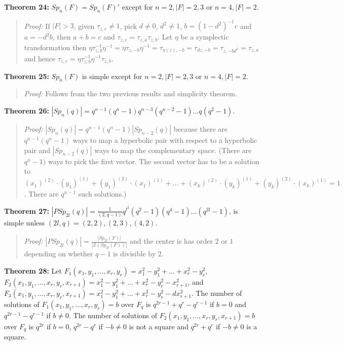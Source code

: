 {\bf Theorem 24:}
$Sp_n(F) = Sp_n(F)'$ except for $n=2, |F|= 2,3$ or $n=4, |F|=2$.
\begin{quote}
\emph{Proof:}  
If $|F|>3$, given $\tau_{z,c} \ne 1$, pick $d \ne 0$, $d^2 \ne 1$,
$b=(1-d^2)^{-1}c$ and $a= -d^2b$, then $a+b=c$ and 
$ \tau_{z,c} = \tau_{z,a} \tau_{z,b}$.  Let $\eta$ be a symplectic transformation then
$\eta \tau_{z,b}^{-1} \eta^{-1} =
\eta \tau_{z,-b} \eta^{-1}=
\tau_{\eta(z),-b}= \tau_{dz,-b}= \tau_{z,-bd^2}= \tau_{z,a}$ and hence
$\tau_{z,c}= \eta \tau_{z,b}^{-1} \eta^{-1} \tau_{z,b}$.
\end{quote}
{\bf Theorem 25:}
$Sp_n(F)$ is simple except for $n=2, |F|= 2,3$ or $n=4, |F|=2$.
\begin{quote}
\emph{Proof:}  
Follows from the two previous results and simplicity theorem.
\end{quote}
{\bf Theorem 26:} 
$|Sp_n(q)| = q^{n-1} (q^n-1) q^{n-3} (q^{n-2} -1) \ldots q(q^2-1)$.
\begin{quote}
\emph{Proof:}
$|Sp_n(q)| = q^{n-1} (q^n-1) |Sp_{n-2}(q)|$ because there are 
$q^{n-1}(q^n-1)$ ways to map a hyperbolic pair with respect to a hyperbolic
pair and $|Sp_{n-2}(q)|$ ways to map the complementary space. (There are
$q^n-1)$ ways to pick  the first vector.  The second vector has to be a
solution to $(x_1)^{(2)} \cdot (y_1)^{(1)} + (y_1)^{(2)} \cdot (x_1)^{(1)} + \ldots +
(x_k)^{(2)} \cdot (y_k)^{(1)} + (y_k)^{(2)} \cdot (x_k)^{(1)} = 1$.  There are
$q^{n-1}$ such solutions.)
\end{quote}
{\bf Theorem 27:}
$|PSp_{2l}(q)|= {\frac 1 {(2,q-1)}} q^{l^2}(q^{2} -1) (q^{4} -1) ...  (q^{2l} -1)$,
is simple unless $(2l,q)= (2,2), (2,3), (4,2)$.
\begin{quote}
\emph{Proof:}  
$|PSp_{2l}(q)|= {\frac {|Sp_{2l}(F)|} {|{\mathbb Z}(Sp_{2l}(F))|} }$ and the center is has order
$2$ or $1$ depending on whether $q-1$ is divisible by $2$.
\end{quote}
{\bf Theorem 28:}
Let $F_1(x_1,y_1, \ldots, x_r, y_r) =x_1^2 - y_1^2 + \ldots + x_r^2 - y_r^2$, 
$F_2(x_1,y_1, \ldots, x_r, y_r, x_{r+1}) =x_1^2 - y_1^2 + \ldots + x_r^2 - y_r^2-x_{r+1}^2$, and
$F_3(x_1,y_1, \ldots, x_r, y_r, x_{r+1}) =x_1^2 - y_1^2 + \ldots + x_r^2 - y_r^2- dx_{r+1}^2$.
The number of solutions of 
$F_1(x_1, y_1, \ldots, x_r, y_r)=b$ over $F_{q}$ is
$q^{2r-1}+q^r-q^{r-1}$ if $b=0$ and
$q^{2r-1}-q^{r-1}$ if $b \ne 0$.
The number of solutions of 
$F_2(x_1, y_1, \ldots, x_r, y_r, x_{r+1})=b$ over $F_{q}$ is
$q^{2r}$ if $b=0$, $q^{2r}-q^r$ if $-b \ne 0$ is not a square and
$q^{2r}+q^r$ if $-b \ne 0$ is a square.

